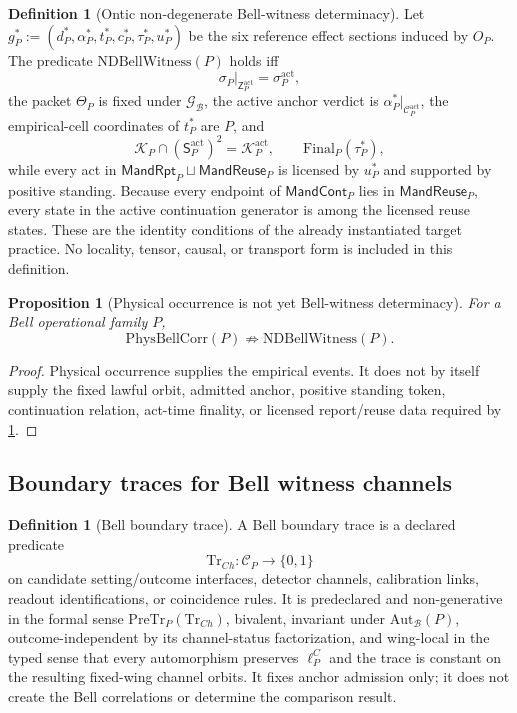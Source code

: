 \documentclass[11pt]{article}
\newtheorem{proposition}[theorem]{Proposition}
\theoremstyle{definition}
\newtheorem{definition}[theorem]{Definition}
\newcommand{\Bell}{\mathcal{B}}
\newcommand{\NDBell}{\mathrm{NDBellWitness}}
\newcommand{\PhysBell}{\mathrm{PhysBellCorr}}
\newcommand{\Trace}{\mathrm{Tr}}
\newcommand{\BellLaw}{\mathscr{G}_{\Bell}}
\newcommand{\AutBell}{\mathrm{Aut}_{\Bell}(P)}
\newcommand{\Active}{\mathrm{act}}
\newcommand{\MandRpt}{\mathsf{MandRpt}}
\newcommand{\MandReuse}{\mathsf{MandReuse}}
\newcommand{\MandCont}{\mathsf{MandCont}}
\newcommand{\FinalP}{\mathrm{Final}_{P}}
\newcommand{\PreTrace}{\mathrm{PreTr}_{P}}
\begin{document}
\begin{definition}[Ontic non-degenerate Bell-witness determinacy]\label{def:ndbell}
Let $g_P^*:=(d_P^*,\alpha_P^*,t_P^*,c_P^*,\tau_P^*,u_P^*)$ be the six reference effect sections induced by $O_P$. The predicate $\NDBell(P)$ holds iff
\[
\sigma_P|_{\mathsf Z_P^{\Active}}=\sigma_P^{\Active},
\]
the packet $\Theta_P$ is fixed under $\BellLaw$, the active anchor verdict is $\alpha_P^*|_{\mathcal C_P^{\Active}}$, the empirical-cell coordinates of $t_P^*$ are $P$, and
\[
\mathcal K_P\cap(\mathsf S_P^{\Active})^2=\mathcal K_P^{\Active},
\qquad
\FinalP(\tau_P^*),
\]
while every act in $\MandRpt_P\sqcup\MandReuse_P$ is licensed by $u_P^*$ and supported by positive standing. Because every endpoint of $\MandCont_P$ lies in $\MandReuse_P$, every state in the active continuation generator is among the licensed reuse states. These are the identity conditions of the already instantiated target practice. No locality, tensor, causal, or transport form is included in this definition.
\end{definition}

\begin{proposition}[Physical occurrence is not yet Bell-witness determinacy]
For a Bell operational family $P$,
\[
\PhysBell(P)\not\Rightarrow\NDBell(P).
\]
\end{proposition}
\begin{proof}
Physical occurrence supplies the empirical events. It does not by itself supply the fixed lawful orbit, admitted anchor, positive standing token, continuation relation, act-time finality, or licensed report/reuse data required by \cref{def:ndbell}.
\end{proof}

\subsection{Boundary traces for Bell witness channels}

\begin{definition}[Bell boundary trace]\label{def:belltrace}
A Bell boundary trace is a declared predicate
\[
\Trace_{Ch}:\mathcal C_P\to\{0,1\}
\]
on candidate setting/outcome interfaces, detector channels, calibration links, readout identifications, or coincidence rules. It is predeclared and non-generative in the formal sense $\PreTrace(\Trace_{Ch})$, bivalent, invariant under $\AutBell$, outcome-independent by its channel-status factorization, and wing-local in the typed sense that every automorphism preserves $\ell_P^C$ and the trace is constant on the resulting fixed-wing channel orbits. It fixes anchor admission only; it does not create the Bell correlations or determine the comparison result.
\end{definition}
\end{document}

